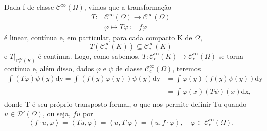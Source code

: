\documentclass[../distribution_theory_notes.tex]{subfiles}
\begin{document}
\begin{example}
	Dada f de classe \(\mathcal{C}^{\infty}(\Omega )\), vimos que a transformação
	\begin{align*}
		T: & \mathcal{C}^{\infty}(\Omega )\rightarrow \mathcal{C}^{\infty}(\Omega ) \\
		   & \varphi \longmapsto T\varphi \coloneqq f\varphi
	\end{align*}
	é linear, contínua e, em particular, para cada compacto K de \(\Omega \),
	\[
		T(\mathcal{C}_{c}^{\infty}(K))\subseteq \mathcal{C}_{c}^{\infty}(K)
	\]
	e \(T|_{\mathcal{C}_{c}^{\infty}(K)}\) é contínua. Logo, como sabemos, \(T:\mathcal{C}_{c}^{\infty}(K)\rightarrow \mathcal{C}_{c}^{\infty}(\Omega )\) se torna contínua e, além disso, dados \(\varphi \) e \(\psi \) de classe \(\mathcal{C}_{c}^{\infty}(\Omega )\), teremos
	\begin{align*}
		\int_{}^{}(T\varphi )\psi (y) \mathrm{dy} = \int_{}^{}(f(y)\varphi (y))\psi (y) \mathrm{dy} & = \int_{}^{}\varphi (y)(f(y)\psi (y)) \mathrm{dy} \\
		                                                                                            & = \int_{}^{}\varphi (x)(T\psi )(x) \mathrm{dx},
	\end{align*}
	donde T é seu próprio transposto formal, o que nos permite definir Tu quando \(u\in \mathcal{D}'(\Omega )\), ou seja, \(fu\) por
	\[
		\left< f \cdot u, \varphi  \right> = \left< Tu, \varphi  \right> = \left< u, T'\varphi  \right> = \left< u, f \cdot \varphi  \right>,\quad \varphi \in \mathcal{C}_{c}^{\infty}(\Omega ).
	\]
\end{example}
\end{document}
